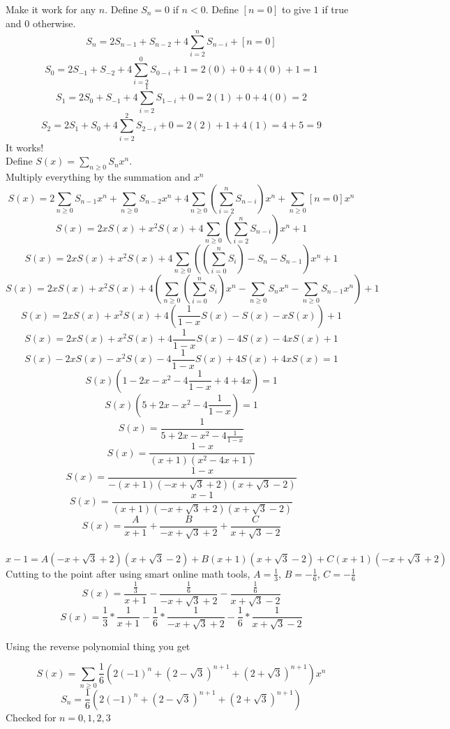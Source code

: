 \documentclass[10pt, AMS Euler]{article}
\begin{document}
    Make it work for any $n$. Define $S_n=0$ if $n<0$. Define $[n=0]$ to give $1$ if true and $0$ otherwise. \\
    $$ S_n = 2 S_{n-1} + S_{n-2} + 4 \sum_{i = 2}^n S_{n-i} + [n=0] $$
    $$ S_0 = 2 S_{-1} + S_{-2} + 4 \sum_{i = 2}^0 S_{0-i} + 1 = 2(0) + 0 +4(0) + 1 = 1 $$
    $$ S_1 = 2 S_{0} + S_{-1} + 4 \sum_{i = 2}^1 S_{1-i} + 0 = 2(1) + 0 + 4(0) = 2 $$
    $$ S_2 = 2 S_{1} + S_{0} + 4 \sum_{i = 2}^2 S_{2-i} + 0 = 2(2) + 1 + 4(1) = 4 + 5 = 9 $$
    It works! \\
    Define $S(x) = \sum_{n \geq 0} S_n x^n $. \\
    Multiply everything by the summation and $x^n$
    $$ S(x) = 2 \sum_{n \geq 0} S_{n-1} x^n + \sum_{n \geq 0} S_{n-2} x^n + 4 \sum_{n \geq 0} (\sum_{i = 2}^n S_{n-i}) x^n + \sum_{n \geq 0} [n=0] x^n $$
    $$ S(x) = 2 x S(x) + x^2 S(x) + 4 \sum_{n \geq 0} (\sum_{i = 2}^n S_{n-i}) x^n + 1 $$
    $$ S(x) = 2 x S(x) + x^2 S(x) + 4 \sum_{n \geq 0} ( (\sum_{i = 0}^n S_i) - S_n - S_{n-1}  ) x^n + 1 $$
    $$ S(x) = 2 x S(x) + x^2 S(x) + 4 (\sum_{n \geq 0} (\sum_{i = 0}^n S_i) x^n - \sum_{n \geq 0} S_n x^n - \sum_{n \geq 0} S_{n-1} x^n) + 1 $$
    $$ S(x) = 2 x S(x) + x^2 S(x) + 4 ( \frac{1}{1-x} S(x) - S(x) - x S(x) ) + 1 $$
    $$ S(x) = 2 x S(x) + x^2 S(x) + 4 \frac{1}{1-x} S(x) - 4 S(x) - 4 x S(x) + 1 $$
    $$ S(x) - 2 x S(x) - x^2 S(x) - 4 \frac{1}{1-x} S(x) + 4 S(x) + 4 x S(x) = 1 $$
    $$ S(x) ( 1 - 2 x - x^2 - 4 \frac{1}{1-x} + 4 + 4 x ) = 1 $$
    $$ S(x) ( 5 + 2 x - x^2 - 4 \frac{1}{1-x} ) = 1 $$
    $$ S(x) = \frac{1}{ 5 + 2 x - x^2 - 4 \frac{1}{1-x} } $$
    $$ S(x) = \frac{1-x}{(x+1)(x^2-4x+1)} $$
    $$ S(x) = \frac{1-x}{-(x+1)(-x+\sqrt{3}+2)(x+\sqrt{3}-2)} $$
    $$ S(x) = \frac{x-1}{(x+1)(-x+\sqrt{3}+2)(x+\sqrt{3}-2)} $$
    $$ S(x) = \frac{A}{x+1} + \frac{B}{-x+\sqrt{3}+2} + \frac{C}{x+\sqrt{3}-2} $$ 
    \\
    $$ x-1 = A(-x+\sqrt{3}+2)(x+\sqrt{3}-2) + B(x+1)(x+\sqrt{3}-2) + C(x+1)(-x+\sqrt{3}+2) $$
    Cutting to the point after using smart online math tools, $A=\frac{1}{3}$, $B=-\frac{1}{6}$, $C=-\frac{1}{6}$
    $$ S(x) = \frac{\frac{1}{3}}{x+1} - \frac{\frac{1}{6}}{-x+\sqrt{3}+2} - \frac{\frac{1}{6}}{x+\sqrt{3}-2} $$ 
    $$ S(x) = \frac{1}{3} * \frac{1}{x+1} - \frac{1}{6} * \frac{1}{-x+\sqrt{3}+2} - \frac{1}{6} * \frac{1}{x+\sqrt{3}-2} $$ 

    Using the reverse polynomial thing you get

    $$ S(x) = \sum_{n \geq 0} \frac{1}{6} (2(-1)^n + (2-\sqrt{3})^{n+1} + (2+\sqrt{3})^{n+1} ) x^n $$
    $$ S_n = \frac{1}{6} (2(-1)^n + (2-\sqrt{3})^{n+1} + (2+\sqrt{3})^{n+1} ) $$
    Checked for $n=0,1,2,3$\\
 
\end{document}
